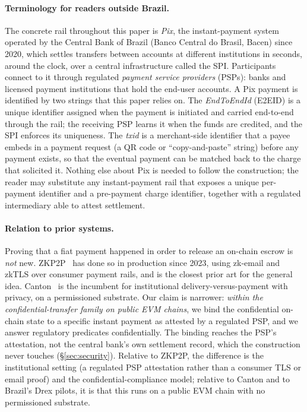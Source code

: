 \documentclass[11pt]{article}
\begin{document}
\paragraph{Terminology for readers outside Brazil.}
The concrete rail throughout this paper is \emph{Pix}, the instant-payment
system operated by the Central Bank of Brazil (Banco Central do Brasil, Bacen)
since 2020, which settles transfers between accounts at different institutions
in seconds, around the clock, over a central infrastructure called the SPI.
Participants connect to it through regulated \emph{payment service providers}
(PSPs): banks and licensed payment institutions that hold the end-user
accounts. A Pix payment is identified by two strings that this paper relies
on. The \emph{EndToEndId} (E2EID) is a unique identifier assigned when the
payment is initiated and carried end-to-end through the rail; the receiving
PSP learns it when the funds are credited, and the SPI enforces its
uniqueness. The \emph{txid} is a merchant-side identifier that a payee embeds in
a payment request (a QR code or ``copy-and-paste'' string) before any payment
exists, so that the eventual payment can be matched back to the charge that
solicited it. Nothing else about Pix is needed to follow the construction; the
reader may substitute any instant-payment rail that exposes a unique per-payment
identifier and a pre-payment charge identifier, together with a regulated
intermediary able to attest settlement.

\paragraph{Relation to prior systems.}
Proving that a fiat payment happened in order to release an on-chain escrow is
\emph{not} new. ZKP2P~\cite{zkp2p} has done so in production since 2023, using
zk-email and zkTLS over consumer payment rails, and is the closest prior art
for the general idea. Canton~\cite{canton} is the incumbent for institutional
delivery-versus-payment with privacy, on a permissioned substrate. Our claim is
narrower: \emph{within the confidential-transfer family on public EVM chains},
we bind the confidential on-chain state to a specific instant payment as
attested by a regulated PSP, and we answer regulatory predicates
confidentially. The binding reaches the PSP's attestation, not the central
bank's own settlement record, which the construction never touches
(\S\ref{sec:security}). Relative to ZKP2P, the difference is the institutional
setting (a regulated PSP attestation rather than a consumer TLS or email proof)
and the confidential-compliance model; relative to Canton and to Brazil's Drex
pilots, it is that this runs on a public EVM chain with no permissioned
substrate.
\end{document}
